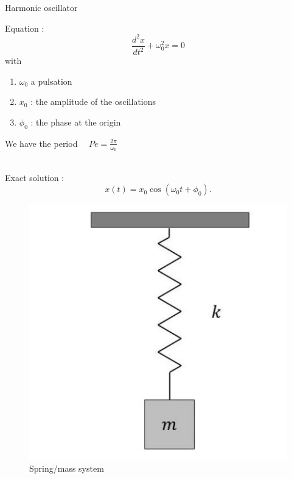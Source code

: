 \documentclass[10pt,xcolor={table,dvipsnames},t]{beamer}
\begin{document}
	\begin{frame}{Harmonic oscillator}
		\begin{minipage}{0.48\linewidth}
			Equation :
			$$\frac{d^2 x}{d t^2}+\omega_0^2 x = 0$$
			with
			\begin{enumerate}[\textbullet]
				\item $\omega_0$ a pulsation
				\item $x_0$ : the amplitude of the oscillations
				\item $\phi_0$ : the phase at the origin
			\end{enumerate}
			We have the period $\quad Pe=\frac{2\pi}{\omega_0}$ \\ \; \\
		\end{minipage}
		\begin{minipage}{0.48\linewidth}
			Exact solution :
			$$x(t) = x_0 \cos(\omega_{0}t+\phi_0).$$ 
			\begin{figure}
				\centering
				\includegraphics[width=0.65\linewidth]{"images/intro/mass_sping.png"}
				\caption{Spring/mass system}
			\end{figure}
		\end{minipage}	
	\end{frame}
\end{document}
